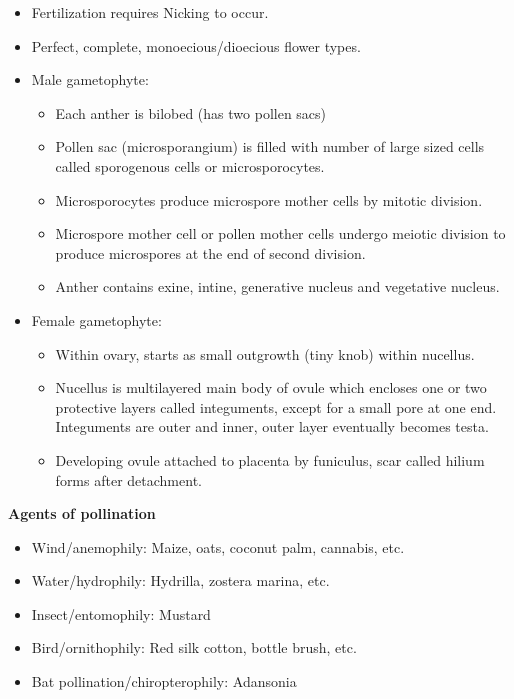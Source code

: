 \documentclass[
  openany]{book}
\providecommand{\tightlist}{%
  \setlength{\itemsep}{0pt}\setlength{\parskip}{0pt}}
\begin{document}
\begin{itemize}
\tightlist
\item
  Fertilization requires Nicking to occur.
\item
  Perfect, complete, monoecious/dioecious flower types.
\item
  Male gametophyte:

  \begin{itemize}
  \tightlist
  \item
    Each anther is bilobed (has two pollen sacs)
  \item
    Pollen sac (microsporangium) is filled with number of large sized cells called sporogenous cells or microsporocytes.
  \item
    Microsporocytes produce microspore mother cells by mitotic division.
  \item
    Microspore mother cell or pollen mother cells undergo meiotic division to produce microspores at the end of second division.
  \item
    Anther contains exine, intine, generative nucleus and vegetative nucleus.
  \end{itemize}
\item
  Female gametophyte:

  \begin{itemize}
  \tightlist
  \item
    Within ovary, starts as small outgrowth (tiny knob) within nucellus.
  \item
    Nucellus is multilayered main body of ovule which encloses one or two protective layers called integuments, except for a small pore at one end. Integuments are outer and inner, outer layer eventually becomes testa.
  \item
    Developing ovule attached to placenta by funiculus, scar called hilium forms after detachment.
  \end{itemize}
\end{itemize}

\textbf{Agents of pollination}

\begin{itemize}
\tightlist
\item
  Wind/anemophily: Maize, oats, coconut palm, cannabis, etc.
\item
  Water/hydrophily: Hydrilla, zostera marina, etc.
\item
  Insect/entomophily: Mustard
\item
  Bird/ornithophily: Red silk cotton, bottle brush, etc.
\item
  Bat pollination/chiropterophily: Adansonia
\end{itemize}
\end{document}
